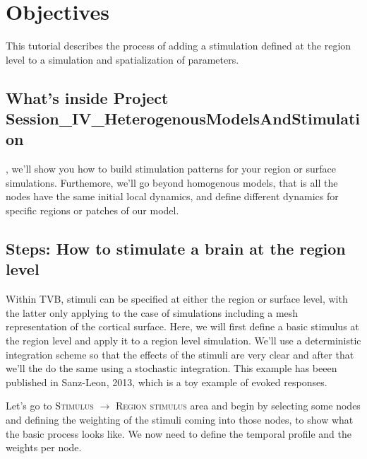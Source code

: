 \documentclass{tufte-handout}
\begin{document}
\section{Objectives}\label{sec:objectives}

This tutorial describes the process of adding a stimulation defined at the
region level to a simulation and spatialization of parameters.


\subsection{What's inside Project Session\_IV\_HeterogenousModelsAndStimulation}\label{sec:project_data}

, we'll show you how to build stimulation patterns for your region or surface simulations. Furthemore, we'll go beyond homogenous models, that is all the nodes have the same initial local dynamics,  and define different dynamics for specific regions or patches of our model. 

\subsection{Steps: How to stimulate a brain at the region level}\label{sec:steps}

Within TVB, stimuli can be specified at either the region or surface level,
with the latter only applying to the case of simulations including a mesh
representation of the cortical surface. Here, we will first define a basic
stimulus at the region level and apply it to a region level simulation. We'll
use a deterministic integration scheme so that the effects of the stimuli are
very clear and after that  we'll the do the same using a stochastic
integration. This example has beeen published in Sanz-Leon, 2013, which is a
toy example of evoked responses.


Let's go to \textsc{Stimulus} $\rightarrow$ \textsc{Region stimulus} area and
begin by selecting some nodes and defining the weighting of the stimuli coming
into those nodes, to show what the basic process looks like. We now need to define the temporal profile and the weights per node. 
\end{document}
